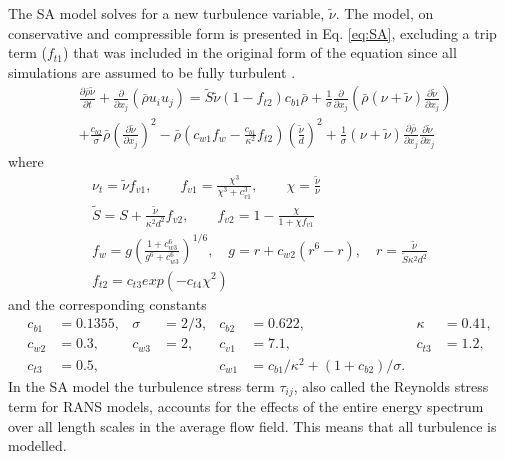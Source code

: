The SA model solves for a new turbulence variable, $\tilde{\nu}$. The model, on conservative and compressible form is presented in Eq. \ref{eq:SA}, excluding a trip term ($f_{t1}$) that was included in the original form of the equation since all simulations are assumed to be fully turbulent \cite{SA,SAmod}.
\begin{equation}
\begin{aligned}
  &\frac{\partial\bar{\rho}\tilde{\nu}}{\partial t}+\frac{\partial}{\partial x_j}\left(\bar{\rho}{u}_i{u}_j\right) = \tilde{S}\tilde{\nu}\left(1-f_{t2}\right)c_{b1}\bar{\rho}+\frac{1}{\sigma}\frac{\partial}{\partial x_j}\left(\bar{\rho} \left(\nu+\tilde{\nu}\right)\frac{\partial \tilde{\nu}}{\partial x_j}\right)\\
  &+\frac{c_{b2}}{\sigma}\bar{\rho}\left(\frac{\partial \tilde{\nu}}{\partial x_j}\right)^2-\bar{\rho}\left(c_{w1}f_w-\frac{c_{b1}}{\kappa ^2}f_{t2}\right)\left(\frac{\tilde{\nu}}{d}\right)^2+\frac{1}{\sigma}\left(\nu+\tilde{\nu}\right)\frac{\partial \bar{\rho}}{\partial x_j}\frac{\partial \tilde{\nu}}{\partial x_j}\label{eq:SA}
\end{aligned}
\end{equation}
where  
\begin{equation}
  \begin{gathered}
    \nu_t = \tilde{\nu}f_{v1}, \qquad f_{v1}=\frac{\chi^3}{\chi^3+c_{v1}^3},\qquad \chi = \frac{\tilde{\nu}}{\nu}\\
  \tilde{S} = S + \frac{\tilde{\nu}}{\kappa ^2 d ^2}f_{v2}, \qquad f_{v2}=1-\frac{\chi}{1+\chi f_{v1}}\\
  f_w=g\left(\frac{1+c_{w3}^6}{g^6+c_{w3}^6}\right)^{1/6},\quad g=r+c_{w2}\left(r^6-r\right), \quad r=\frac{\tilde{\nu}}{\tilde{S}\kappa^2d^2}\\
    f_{t2} = c_{t3}exp\left(-c_{t4}\chi^2\right)\label{eq:SAf}
  \end{gathered}
  \end{equation}
and the corresponding constants 
\begin{equation}
  \begin{aligned}
    c_{b1}&=0.1355, & \sigma&=2/3, &  c_{b2}&=0.622,                                          &  \kappa&=0.41, \\
    c_{w2}&=0.3,    & c_{w3}&=2,   &  c_{v1}&=7.1,                                            &  c_{t3}&=1.2, \\
    c_{t3}&=0.5,    &       &      &  c_{w1}&=c_{b1}/\kappa^2+\left(1+c_{b2}\right)/\sigma.   &        &
  \end{aligned}
\end{equation}
In the SA model the turbulence stress term $\tau _{ij}$, also called the Reynolds stress term for RANS models, accounts for the effects of the entire energy spectrum over all length scales in the average flow field. This means that all turbulence is modelled. 

